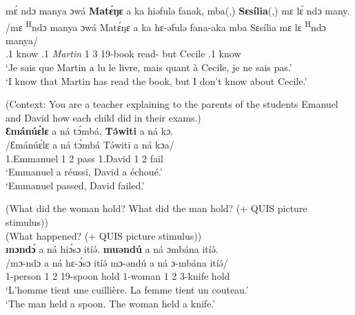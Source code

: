\documentclass[output=paper,colorlinks,citecolor=brown
]{langscibook}
\begin{document}
\ea
\label{topdontknowCecile}
\glll
{\db}mɛ́ ndɔ manya ɔwá \textbf{Matɛ́ŋɛ} a ka hiəfulə fanak, mba(,) \textbf{Sɛsília}(,) mɛ lɛ́ ndɔ many. \\
/mɛ \textsuperscript{H}ndɔ manya ɔwá Matɛ́ŋɛ a ka hɛ-əfulə fana-aka mba Sɛsília mɛ lɛ \textsuperscript{H}ndɔ manya/ \\
{\db}\SM{}.1\SG{} \PRS{} know \REL{}.1{} \textit{Martin} 1\SM{} \PST{}3{} 19-book read-\DUR{} but Cecile \SM{}.1\SG{} \NEG{} \PRS{} know \\
\glt
`Je sais que Martin a lu le livre, mais quant à Cecile, je ne sais pas.' \\ `I know that Martin has read the book, but I don't know about Cecile.' \jambox*{[JO 907] } 

\z

\ea
\label{topemdavid}
(Context: You are a teacher explaining to the parents of the students Emanuel and David how each child did in their exams.) \\ 
\glll
{\db}\textbf{Ɛmánúɛ́lɛ} a ná tɔ́mbá, \textbf{Tə́witi} a ná kɔ. \\
/Ɛmánúɛ́lɛ a ná tɔ́mbá Tə́witi a ná kɔa/ \\
{\db}1{}.Emmanuel 1\SM{} \PST{}2{} pass 1{}.David 1\SM{} \PST{}2{} fail \\
\glt
`Emmanuel a réussi, David a échoué.' \\ `Emmanuel passed, David failed.' \jambox*{[JO 533] }

\z

\ea
\label{contrastivetwocontexts}
(What did the woman hold? What did the man hold? (+ QUIS picture stimulus)) \\ (What happened? (+ QUIS picture stimulus)) \\ 
\glll
{\db}\textbf{mɔndɔ́} a ná hiɔ́sɔ itíə́. \textbf{muəndú} a ná ɔmbána itíə́.\\
/mɔ-ndɔ a ná hɛ-ɔ́sɔ itíə́ mɔ-əndú a ná ɔ-mbána itíə́/ \\
{\db}1-person 1\SM{} \PST{}2{} 19-spoon hold 1-woman 1\SM{} \PST{}2{} 3-knife hold \\
\glt
`L'homme tient une cuillière. La femme tient un couteau.' \\ `The man held a spoon. The woman held a knife.'\jambox*{[JO 629] }
\end{document}
